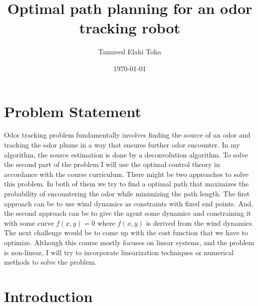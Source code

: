 \documentclass[letterpaper,10pt]{article}
\title{Optimal path planning for an odor tracking robot}
\author{Tamzeed Elahi Toha}
\date{\today}
\begin{document}
\maketitle

\section*{Problem Statement}
Odor tracking problem fundamentally involves finding the source of an odor and tracking the odor plume in a way that ensures further odor encounter. In my algorithm, the source estimation is done by a deconvolution algorithm. To solve the second part of the problem I will use the optimal control theory in accordance with the course curriculum. There might be two approaches to solve this problem. In both of them we try to find a optimal path that maximizes the probability of encountering the odor while minimizing the path length. The first approach can be to use wind dynamics as constraints with fixed end points. And, the second approach can be to give the agent some dynamics and constraining it with some curve $f(x,y) = 0$ where $f(x,y)$ is derived from the wind dynamics. The next challenge would be to come up with the cost function that we have to optimize. Although this course mostly focuses on linear systems, and the problem is non-linear, I will try to incorporate linearization techniques or numerical methods to solve the problem.



\section*{Introduction}
\end{document}
